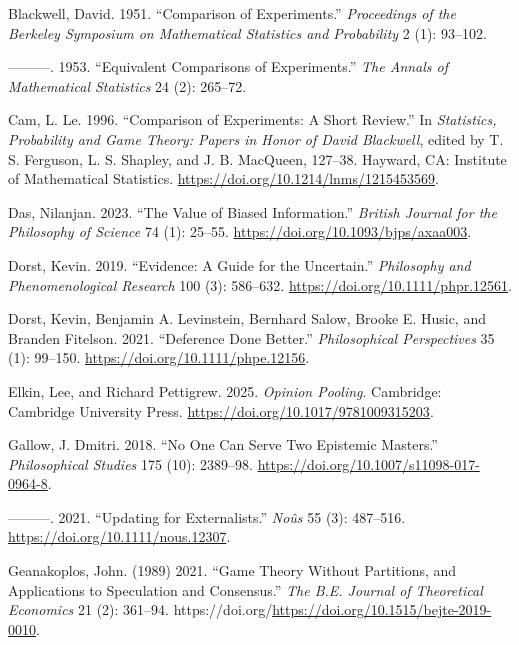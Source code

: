 \documentclass[
  12pt,
  letterpaper,
  DIV=11,
  numbers=noendperiod]{scrartcl}
\newlength{\cslhangindent}
\newenvironment{CSLReferences}[2] %
 {\begin{list}{}{%
  \setlength{\itemindent}{0pt}
  \setlength{\leftmargin}{0pt}
  \setlength{\parsep}{0pt}
  \ifodd #1
   \setlength{\leftmargin}{\cslhangindent}
   \setlength{\itemindent}{-1\cslhangindent}
  \fi
  \setlength{\itemsep}{#2\baselineskip}}}
 {\end{list}}
\begin{document}
\label{refs}
\begin{CSLReferences}{1}{0}
Blackwell, David. 1951. {``Comparison of Experiments.''}
\emph{Proceedings of the Berkeley Symposium on Mathematical Statistics
and Probability} 2 (1): 93--102.

---------. 1953. {``Equivalent Comparisons of Experiments.''} \emph{The
Annals of Mathematical Statistics} 24 (2): 265--72.

Cam, L. Le. 1996. {``Comparison of Experiments: A Short Review.''} In
\emph{Statistics, Probability and Game Theory: Papers in Honor of David
Blackwell}, edited by T. S. Ferguson, L. S. Shapley, and J. B. MacQueen,
127--38. Hayward, CA: Institute of Mathematical Statistics.
\url{https://doi.org/10.1214/lnms/1215453569}.

Das, Nilanjan. 2023. {``The Value of Biased Information.''}
\emph{British Journal for the Philosophy of Science} 74 (1): 25--55.
\url{https://doi.org/10.1093/bjps/axaa003}.

Dorst, Kevin. 2019. {``Evidence: A Guide for the Uncertain.''}
\emph{Philosophy and Phenomenological Research} 100 (3): 586--632.
\url{https://doi.org/10.1111/phpr.12561}.

Dorst, Kevin, Benjamin A. Levinstein, Bernhard Salow, Brooke E. Husic,
and Branden Fitelson. 2021. {``Deference Done Better.''}
\emph{Philosophical Perspectives} 35 (1): 99--150.
\url{https://doi.org/10.1111/phpe.12156}.

Elkin, Lee, and Richard Pettigrew. 2025. \emph{Opinion Pooling}.
Cambridge: Cambridge University Press.
\url{https://doi.org/10.1017/9781009315203}.

Gallow, J. Dmitri. 2018. {``No One Can Serve Two Epistemic Masters.''}
\emph{Philosophical Studies} 175 (10): 2389--98.
\url{https://doi.org/10.1007/s11098-017-0964-8}.

---------. 2021. {``Updating for Externalists.''} \emph{Noûs} 55 (3):
487--516. \url{https://doi.org/10.1111/nous.12307}.

Geanakoplos, John. (1989) 2021. {``Game Theory Without Partitions, and
Applications to Speculation and Consensus.''} \emph{The B.E. Journal of
Theoretical Economics} 21 (2): 361--94.
https://doi.org/\url{https://doi.org/10.1515/bejte-2019-0010}.


\end{CSLReferences}
\end{document}
